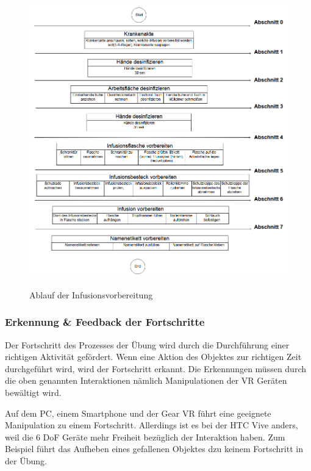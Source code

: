 \begin{figure}[ht]
\vspace*{1em}
\centering
\caption{Ablauf der Infusionsvorbereitung}
\includegraphics[width=\textwidth]{images/ablaufFertig.png}
\label{fig:AblaufInfusionsvorbereitung} 
\end{figure}
  
  \subsubsection{Erkennung \& Feedback der Fortschritte}
  Der Fortschritt des Prozesses der Übung wird durch die Durchführung einer richtigen Aktivität gefördert. Wenn eine Aktion des Objektes zur richtigen Zeit durchgeführt wird, wird der Fortschritt erkannt. Die Erkennungen müssen durch die oben genannten Interaktionen nämlich Manipulationen der VR Geräten bewältigt wird. %
  
  Auf dem PC, einem Smartphone und der Gear VR führt eine geeignete Manipulation zu einem Fortschritt. Allerdings ist es bei der HTC Vive anders, weil die 6 DoF Geräte mehr Freiheit bezüglich der Interaktion haben. Zum Beispiel führt das Aufheben eines gefallenen Objektes dzu keinem Fortschritt in der Übung. 
  
